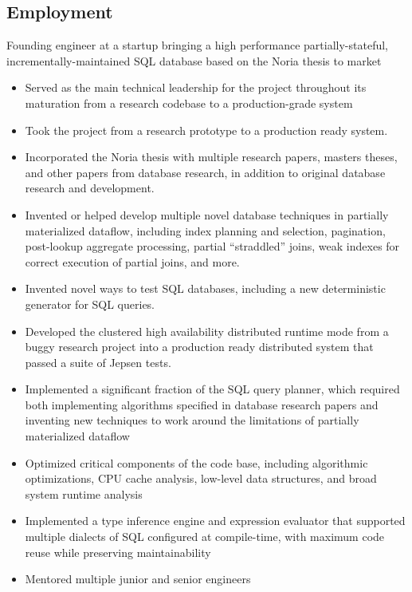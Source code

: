 \documentclass[10pt,a4paper,sans]{moderncv}        %
\begin{document}
\subsection{Employment}
{Founding engineer at a startup bringing a high performance
  partially-stateful, incrementally-maintained SQL database based on the Noria
  thesis to market
  \begin{itemize}
    \item Served as the main technical leadership for the project throughout its
          maturation from a research codebase to a production-grade system
    \item Took the project from a research prototype to a production ready
          system.
    \item Incorporated the Noria thesis with multiple research papers,
          masters theses, and other papers from database research, in addition to
          original database research and development.
    \item Invented or helped develop multiple novel database techniques in
          partially materialized dataflow, including index planning and
          selection, pagination, post-lookup aggregate processing, partial
          ``straddled'' joins, weak indexes for correct execution of partial
          joins, and more.
    \item Invented novel ways to test SQL databases, including a new deterministic
          generator for SQL queries.
    \item Developed the clustered high availability distributed runtime mode from
          a buggy research project into a production ready distributed system
          that passed a suite of Jepsen tests.
    \item Implemented a significant fraction of the SQL query planner, which
          required both implementing algorithms specified in database research
          papers and inventing new techniques to work around the limitations of
          partially materialized dataflow
    \item Optimized critical components of the code base, including algorithmic
          optimizations, CPU cache analysis, low-level data structures, and
          broad system runtime analysis
    \item Implemented a type inference engine and expression evaluator that
          supported multiple dialects of SQL configured at compile-time, with
          maximum code reuse while preserving maintainability
    \item Mentored multiple junior and senior engineers
  \end{itemize}}
\end{document}
